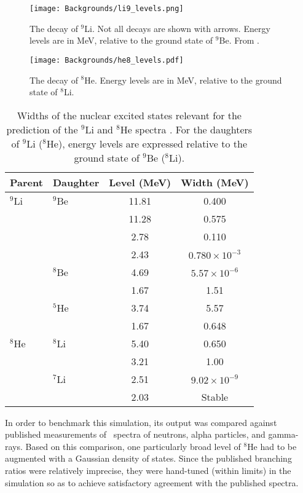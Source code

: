 \documentclass[../thesis.tex]{subfiles}
\begin{document}
\begin{figure}[h]
  \texttt{[image: Backgrounds/li9\_levels.png]}
  \caption{The decay of $^9$Li. Not all decays are shown with arrows. Energy levels are in MeV, relative to the ground state of $^9$Be. From \cite{pedroLi9Spec2}.}
  \label{fig:li9_levels}
\end{figure}

\begin{figure}[h]
  \texttt{[image: Backgrounds/he8\_levels.pdf]}
  \caption{The decay of $^8$He. Energy levels are in MeV, relative to the ground state of $^8$Li.}
  \label{fig:he8_levels}
\end{figure}

\begin{table}[ht]
  \begin{tabular}{llcc}
    \toprule
    Parent & Daughter & Level (MeV) & Width (MeV) \\
    \midrule
    $^9$Li & $^9$Be & 11.81 & 0.400 \\
           & & 11.28 & 0.575 \\
           & & 2.78 & 0.110 \\
           & & 2.43 & $0.780 \times 10^{-3}$ \\
           & $^8$Be & 4.69 & $5.57 \times 10^{-6}$ \\
           & & 1.67 & 1.51 \\
           & $^5$He & 3.74 & 5.57 \\
           & & 1.67 & 0.648 \\
    \midrule
    $^8$He & $^8$Li & 5.40 & 0.650 \\
           & & 3.21 & 1.00 \\
           & $^7$Li & 2.51 & $9.02\times10^{-9}$ \\
           & & 2.03 & Stable \\
    \bottomrule
  \end{tabular}
  \caption{Widths of the nuclear excited states relevant for the prediction of the $^9$Li and $^8$He spectra \cite{ENDF}. For the daughters of $^9$Li ($^8$He), energy levels are expressed relative to the ground state of $^9$Be ($^8$Li).}
  \label{tab:bkgLi9Widths}
\end{table}

In order to benchmark this simulation, its output was compared against published measurements of \LiHe\ spectra of neutrons, alpha particles, and gamma-rays. Based on this comparison, one particularly broad level of $^8$He had to be augmented with a Gaussian density of states. Since the published branching ratios were relatively imprecise, they were hand-tuned (within limits) in the simulation so as to achieve satisfactory agreement with the published spectra.
\end{document}
